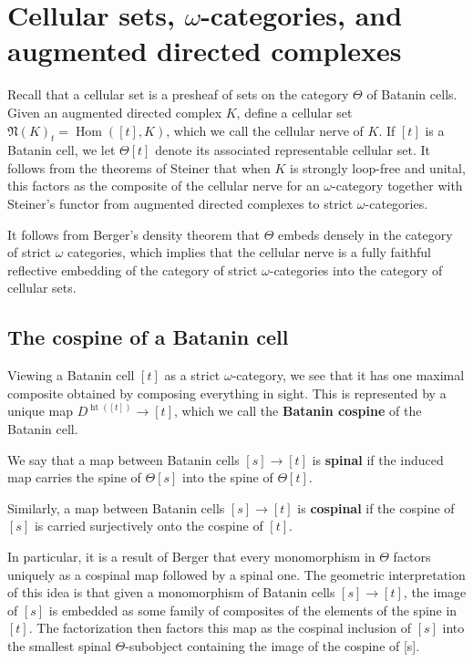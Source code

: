 \documentclass[10pt]{amsart}
\numberwithin{equation}{section}
\theoremstyle{plain}   %
\theoremstyle{remark}
\theoremstyle{plain}
\DeclareMathOperator{\heit}{ht}
\newcommand{\dfn}{\textbf}
\begin{document}
\section{Cellular sets, $\omega$-categories, and augmented directed complexes}
Recall that a cellular set is a presheaf of sets on the category \(\Theta\) of Batanin cells.  Given an augmented directed complex \(K\), define a cellular set \(\mathfrak{N}(K)_t=\operatorname{Hom}([t],K)\), which we call the cellular nerve of \(K\).  If \([t]\) is a Batanin cell, we let \(\Theta[t]\) denote its associated representable cellular set.  It follows from the theorems of Steiner that when \(K\) is strongly loop-free and unital, this factors as the composite of the cellular nerve for an \(\omega\)-category together with Steiner's functor from augmented directed complexes to strict \(\omega\)-categories.  

It follows from Berger's density theorem that \(\Theta\) embeds densely in the category of strict \(\omega\) categories, which implies that the cellular nerve is a fully faithful reflective embedding of the category of strict \(\omega\)-categories into the category of cellular sets.   
\subsection{The cospine of a Batanin cell}
Viewing a Batanin cell \([t]\) as a strict \(\omega\)-category, we see that it has one maximal composite obtained by composing everything in sight.  This is represented by a unique map \(D^{\heit([t])}\to [t]\), which we call the \dfn{Batanin cospine} of the Batanin cell. 

We say that a map between Batanin cells \([s]\to [t]\) is \dfn{spinal} if the induced map carries the spine of \(\Theta[s]\) into the spine of \(\Theta[t]\).  

Similarly, a map between Batanin cells \([s]\to [t]\) is \dfn{cospinal} if the cospine of \([s]\) is carried surjectively onto the cospine of \([t]\).  

In particular, it is a result of Berger that every monomorphism in \(\Theta\) factors uniquely as a cospinal map followed by a spinal one. The geometric interpretation of this idea is that given a monomorphism of Batanin cells \([s]\to [t]\), the image of \([s]\) is embedded as some family of composites of the elements of the spine in \([t]\).  The factorization then factors this map as the cospinal inclusion of \([s]\) into the smallest spinal \(\Theta\)-subobject containing the image of the cospine of [s].  
\end{document}
